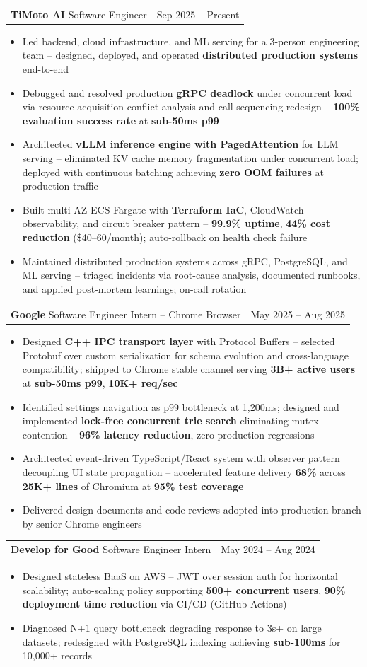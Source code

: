 \documentclass[letterpaper,11pt]{article}
\makeatletter
\newcommand{\resumeItem}[1]{
  \item\small{{#1 \vspace{-2pt}}}
}
\newcommand{\resumeSubheadingShortSplit}[3]{%
  \vspace{-2pt}\item
    \begin{tabular*}{0.98\textwidth}[t]{l@{\extracolsep{\fill}}r}
      {\normalsize\textbf{#1}} \textbar{} {\normalsize #2} & {\normalsize #3} \\
    \end{tabular*}\vspace{-7pt}
}
\newcommand{\resumeItemListStart}{\begin{itemize}}
\newcommand{\resumeItemListEnd}{\end{itemize}\vspace{-5pt}}
\makeatother
\begin{document}
    \resumeSubheadingShortSplit
      {TiMoto AI}{Software Engineer}{Sep 2025 -- Present}
        \resumeItemListStart
          \resumeItem{Led backend, cloud infrastructure, and ML serving for a 3-person engineering team -- designed, deployed, and operated \textbf{distributed production systems} end-to-end}
          \resumeItem{Debugged and resolved production \textbf{gRPC deadlock} under concurrent load via resource acquisition conflict analysis and call-sequencing redesign -- \textbf{100\% evaluation success rate} at \textbf{sub-50ms p99}}
          \resumeItem{Architected \textbf{vLLM inference engine with PagedAttention} for LLM serving -- eliminated KV cache memory fragmentation under concurrent load; deployed with continuous batching achieving \textbf{zero OOM failures} at production traffic}
          \resumeItem{Built multi-AZ ECS Fargate with \textbf{Terraform IaC}, CloudWatch observability, and circuit breaker pattern -- \textbf{99.9\% uptime}, \textbf{44\% cost reduction} (\$40--60/month); auto-rollback on health check failure}
          \resumeItem{Maintained distributed production systems across gRPC, PostgreSQL, and ML serving -- triaged incidents via root-cause analysis, documented runbooks, and applied post-mortem learnings; on-call rotation}
      \resumeItemListEnd

    \resumeSubheadingShortSplit
      {Google}{Software Engineer Intern -- Chrome Browser}{May 2025 -- Aug 2025}
      \resumeItemListStart
        \resumeItem{Designed \textbf{C++ IPC transport layer} with Protocol Buffers -- selected Protobuf over custom serialization for schema evolution and cross-language compatibility; shipped to Chrome stable channel serving \textbf{3B+ active users} at \textbf{sub-50ms p99}, \textbf{10K+ req/sec}}
        \resumeItem{Identified settings navigation as p99 bottleneck at 1,200ms; designed and implemented \textbf{lock-free concurrent trie search} eliminating mutex contention -- \textbf{96\% latency reduction}, zero production regressions}
        \resumeItem{Architected event-driven TypeScript/React system with observer pattern decoupling UI state propagation -- accelerated feature delivery \textbf{68\%} across \textbf{25K+ lines} of Chromium at \textbf{95\% test coverage}}
        \resumeItem{Delivered design documents and code reviews adopted into production branch by senior Chrome engineers}
      \resumeItemListEnd

    \resumeSubheadingShortSplit
      {Develop for Good}{Software Engineer Intern}{May 2024 -- Aug 2024}
      \resumeItemListStart
        \resumeItem{Designed stateless BaaS on AWS -- JWT over session auth for horizontal scalability; auto-scaling policy supporting \textbf{500+ concurrent users}, \textbf{90\% deployment time reduction} via CI/CD (GitHub Actions)}
        \resumeItem{Diagnosed N+1 query bottleneck degrading response to 3s+ on large datasets; redesigned with PostgreSQL indexing achieving \textbf{sub-100ms} for 10,000+ records}
      \resumeItemListEnd
\end{document}
